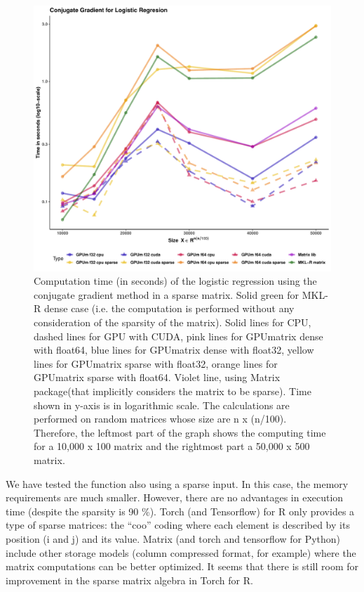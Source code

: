 \begin{figure}
\includegraphics[width=1\linewidth,height=0.5\textheight]{figures/LRGC} \caption{Computation time (in seconds) of the logistic regression using the conjugate gradient method in a sparse matrix. Solid green for MKL-R dense case  (i.e. the computation is performed without any consideration of the sparsity of the matrix). Solid lines for CPU, dashed lines for GPU with CUDA, pink lines for GPUmatrix dense with float64, blue lines for GPUmatrix dense with float32, yellow lines for GPUmatrix sparse with float32, orange lines for GPUmatrix sparse with float64. Violet line, using Matrix package(that implicitly considers the matrix to be sparse). Time shown in y-axis is in logarithmic scale. The calculations are performed on random matrices whose size are n x (n/100). Therefore, the leftmost part of the graph shows the computing time for a 10,000 x 100 matrix and the rightmost part a 50,000 x 500 matrix.}\label{fig:LRGC-sparse}
\end{figure}

We have tested the function also using a sparse input. In this case, the memory requirements are much smaller. However, there are no advantages in execution time (despite the sparsity is 90 \%). Torch (and Tensorflow) for R only provides a type of sparse matrices: the ``coo'' coding where each element is described by its position (i and j) and its value. Matrix (and torch and tensorflow for Python) include other storage models (column compressed format, for example) where the matrix computations can be better optimized. It seems that there is still room for improvement in the sparse matrix algebra in Torch for R.

